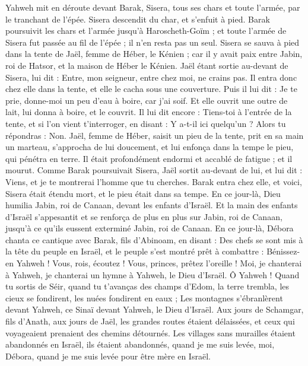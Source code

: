 \begin{multicols}{2}
Yahweh mit en déroute devant Barak,  Sisera, tous ses chars et toute l'armée, par le tranchant de l'épée. Sisera descendit du char, et s'enfuit à pied.
Barak poursuivit les chars et l'armée jusqu'à Haroscheth-Goïm ; et toute l'armée de Sisera fut passée au fil de l'épée ; il n'en resta pas un seul.
Sisera se sauva à pied dans la tente de Jaël, femme de Héber, le Kénien ; car il y avait paix entre Jabin, roi de Hatsor, et la maison de Héber le Kénien.
Jaël étant sortie au-devant de Sisera, lui dit : Entre, mon seigneur, entre chez moi, ne crains pas. Il entra donc chez elle dans la tente, et elle le cacha sous une couverture.
Puis il lui dit : Je te prie, donne-moi un peu d'eau à boire, car j'ai soif. Et elle ouvrit une outre de lait, lui donna à boire, et le couvrit.
Il lui dit encore : Tiens-toi à l'entrée de la tente, et si l’on vient t’interroger, en disant : Y a-t-il ici quelqu'un ? Alors tu répondras : Non.
Jaël, femme de Héber, saisit un pieu de la tente, prit en sa main un marteau, s’approcha de lui doucement, et lui enfonça dans la tempe le pieu, qui pénétra en terre. Il était profondément endormi et accablé de fatigue ; et il mourut.
Comme Barak poursuivait Sisera, Jaël sortit au-devant de lui, et lui dit : Viens, et je te montrerai l'homme que tu cherches. Barak entra chez elle, et voici, Sisera était étendu mort, et le pieu était dans sa tempe.
En ce jour-là, Dieu humilia Jabin, roi de Canaan, devant les enfants d'Israël.
Et la main des enfants d'Israël s’appesantit et se renforça de plus en plus sur Jabin, roi de Canaan, jusqu'à ce qu'ils eussent  exterminé Jabin, roi de Canaan.
\VerseOne{}En ce jour-là, Débora chanta ce cantique avec Barak, fils d'Abinoam, en disant :
Des chefs se sont mis à la tête du peuple en Israël, et le peuple s’est montré prêt à combattre : Bénissez-en Yahweh !
Vous, rois, écoutez ! Vous, princes, prêtez l'oreille !  Moi, je chanterai à Yahweh, je chanterai un hymne à Yahweh, le Dieu d'Israël.
Ô Yahweh ! Quand tu sortis de Séir, quand tu t’avanças des champs d'Edom, la terre trembla, les cieux se fondirent, les nuées fondirent en eaux ;
Les montagnes s'ébranlèrent devant Yahweh, ce Sinaï devant Yahweh, le Dieu d'Israël.
Aux jours de Schamgar, fils d’Anath, aux jours de Jaël, les grandes routes étaient délaissées, et ceux qui voyageaient prenaient des chemins détournés.
Les villages sans murailles étaient abandonnés en Israël, ils étaient abandonnés, quand je me suis levée, moi, Débora, quand je me suis levée pour être mère en Israël.

\end{multicols}
